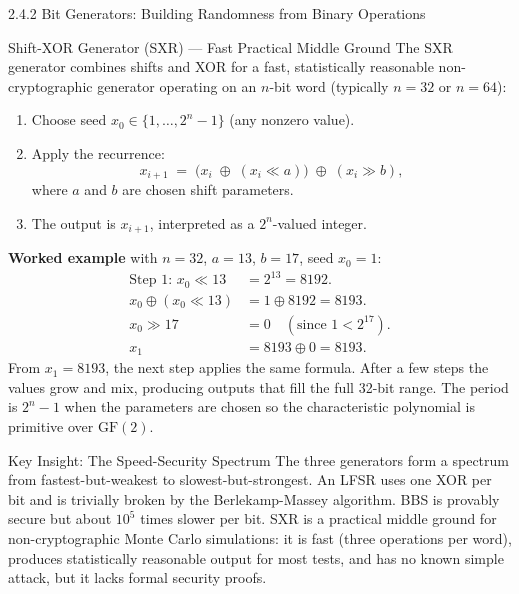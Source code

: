 \documentclass[aspectratio=169,10pt]{beamer}
\begin{document}
\begin{frame}[allowframebreaks]{2.4.2 Bit Generators: Building Randomness from Binary Operations}
\begin{block}{Shift-XOR Generator (SXR) --- Fast Practical Middle Ground}
The SXR generator combines shifts and XOR for a fast, statistically reasonable
non-cryptographic generator operating on an $n$-bit word (typically $n=32$
or $n=64$):
\begin{enumerate}
  \item Choose seed $x_0 \in \{1, \ldots, 2^n - 1\}$ (any nonzero value).
  \item Apply the recurrence:
    \[
      x_{i+1} \;=\; \bigl(x_i \;\oplus\; (x_i \ll a)\bigr)
                    \;\oplus\; (x_i \gg b),
    \]
    where $a$ and $b$ are chosen shift parameters.
  \item The output is $x_{i+1}$, interpreted as a $2^n$-valued integer.
\end{enumerate}

\textbf{Worked example} with $n=32$, $a=13$, $b=17$, seed $x_0 = 1$:
\begin{align*}
  \text{Step 1: } x_0 \ll 13 &= 2^{13} = 8192. \\
  x_0 \oplus (x_0 \ll 13) &= 1 \oplus 8192 = 8193. \\
  x_0 \gg 17 &= 0 \quad (\text{since } 1 < 2^{17}). \\
  x_1 &= 8193 \oplus 0 = 8193.
\end{align*}
From $x_1 = 8193$, the next step applies the same formula.  After a few
steps the values grow and mix, producing outputs that fill the full 32-bit
range.  The period is $2^n - 1$ when the parameters are chosen so the
characteristic polynomial is primitive over $\mathrm{GF}(2)$.
\end{block}

\begin{alertblock}{Key Insight: The Speed-Security Spectrum}
The three generators form a spectrum from fastest-but-weakest to
slowest-but-strongest.  An LFSR uses one XOR per bit and is trivially broken
by the Berlekamp-Massey algorithm.  BBS is provably secure but about $10^5$
times slower per bit.  SXR is a practical middle ground for non-cryptographic
Monte Carlo simulations: it is fast (three operations per word), produces
statistically reasonable output for most tests, and has no known simple attack,
but it lacks formal security proofs.
\end{alertblock}

\end{frame}
\end{document}
